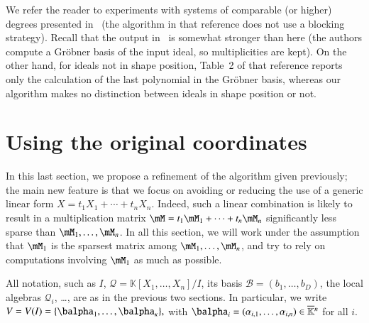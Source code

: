 \documentclass[final,1p,times,authoryear]{elsarticle}
\newcommand{\basis}{\mathscr{B}}
\newcommand{\lf}{X}
\newcommand{\residueI}{\mathscr{Q}}
\newcommand{\trsp}[1]{#1^{\mathsf{T}}} %
\def\dg{\kappa}
\def\K{\mathbb{K}}
\def\K {\ensuremath{\mathbb{K}}}
\def\Kbar {{\ensuremath{\overline{\mathbb{K}}}}}
\newcommand{\mUt}{\trsp{\mU}}
\begin{document}
We refer the reader to experiments with systems of comparable (or
higher) degrees presented in~\citep{FaMo17} (the algorithm in that
reference does not use a blocking strategy). Recall that the output
in~\citep{FaMo17} is somewhat stronger than here (the authors compute a
Gr\"obner basis of the input ideal, so multiplicities are kept). On
the other hand, for ideals not in shape position, Table~2 of that
reference reports only the calculation of the last polynomial in the
Gr\"obner basis, whereas our algorithm makes no distinction between
ideals in shape position or not.



\section{Using the original coordinates}\label{sec:original}

In this last section, we propose a refinement of the algorithm given
previously; the main new feature is that we focus on avoiding or reducing the
use of a generic linear form $\lf = t_1 X_1 + \cdots + t_n X_n$.  Indeed, such
a linear combination is likely to result in a multiplication matrix $\mM = t_1
\mM_1 + \cdots + t_n \mM_n$ significantly less sparse than $\mM_1,\dots,\mM_n$.
In all this section, we will work under the assumption that $\mM_1$ is the
sparsest matrix among $\mM_1,\dots,\mM_n$, and try to rely on computations
involving $\mM_1$ as much as possible.

All notation, such as $I$, $\residueI=\K[X_1,\dots,X_n]/I$, its basis
$\basis=(b_1,\dots,b_D)$, the local algebras $\residueI_i$, \dots, are as in the  previous two sections.
In particular, we write $V=V(I)=\{\balpha_1,\dots,\balpha_\dg\},$ with
$\balpha_i=(\alpha_{i,1},\dots,\alpha_{i,n}) \in \Kbar{}^n$ for all $i$.
\end{document}
